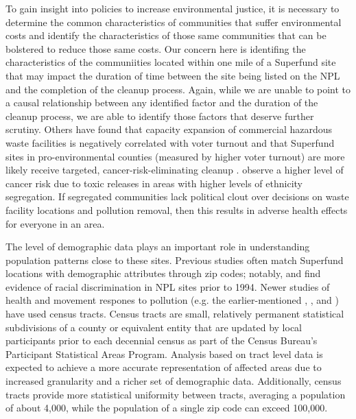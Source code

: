 \documentclass[12pt]{article}
\begin{document}
To gain insight into policies to increase environmental justice, it is necessary to determine the common characteristics of communities that suffer environmental costs and identify the characteristics of those same communities that can be bolstered to reduce those same costs. Our concern here is identifing the characteristics of the communiities located within one mile of a Superfund site that may impact the duration of time between the site being listed on the NPL and the completion of the cleanup process. Again, while we are unable to point to a causal relationship between any identified factor and the duration of the cleanup process, we are able to identify those factors that deserve further scrutiny. Others have found that capacity expansion of commercial hazardous waste facilities is negatively correlated with voter turnout \parencite{Hamilton1995} and that Superfund sites in pro-environmental counties (measured by higher voter turnout) are more likely receive targeted, cancer-risk-eliminating cleanup \parencite{hamilton1999calculating}. \textcite{Morello-Frosch2006} observe a higher level of cancer risk due to toxic releases in areas with higher levels of ethnicity segregation. If segregated communities lack political clout over decisions on waste facility locations and pollution removal, then this results in adverse health effects for everyone in an area. 

The level of demographic data plays an important role in understanding population patterns close to these sites. Previous studies often match Superfund locations with demographic attributes through zip codes; notably, \textcite{burda2014environmental} and find evidence of racial discrimination in NPL sites prior to 1994. Newer studies of health and movement respones to pollution (e.g. the earlier-mentioned \textcite{Morello-Frosch2006}, \textcite{Gamper-Rabindran2013}, and \textcite{Depro2015}) have used census tracts. Census tracts are small, relatively permanent statistical subdivisions of a county or equivalent entity that are updated by local participants prior to each decennial census as part of the Census Bureau's Participant Statistical Areas Program. Analysis based on tract level data is expected to achieve a more accurate representation of affected areas due to increased granularity \parencite{ProximityOne2019} and a richer set of demographic data. %
Additionally, census tracts provide more statistical uniformity between tracts, averaging a population of about 4,000, while the population of a single zip code can exceed 100,000. %
\end{document}

